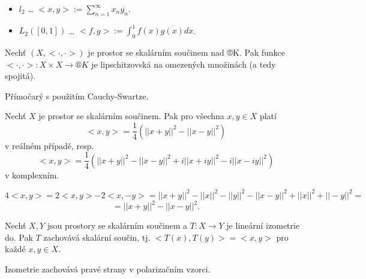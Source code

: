 \documentclass[12pt]{article}					%
\begin{document}
\begin{priklady}
	\begin{itemize}
		\item $l_2$ … $<x, y> := \sum_{n=1}^∞ x_n \overline{y_n}$.
		\item $L_2([0, 1])$ … $<f, g> := \int_0^1 f(x) \overline{g(x)} dx$.
	\end{itemize}
\end{priklady}

\begin{tvrzeni}
	Nechť $(X, <·, ·>)$ je prostor se skalárním součinem nad ®K. Pak funkce $<·, ·>: X \times X \rightarrow ®K$ je lipschitzovská na omezených množinách (a tedy spojitá).

	\begin{dukazin}
		Přímočarý s použitím Cauchy-Swartze.
	\end{dukazin}
\end{tvrzeni}

\begin{tvrzeni}
	Nechť $X$ je prostor se skalárním součinem. Pak pro všechna $x, y \in X$ platí
	$$ <x, y> = \frac{1}{4}(||x + y||^2 - ||x - y||^2) $$
	v reálném případě, resp.
	$$ <x, y> = \frac{1}{4}(||x + y||^2 - ||x - y||^2 + i||x + iy||^2 - i||x - iy||^2) $$
	v komplexním.

	\begin{dukazin}
		$$ 4<x, y> = 2<x, y> - 2<x, -y> = ||x + y||^2 - ||x||^2 - ||y||^2 - ||x - y||^2 + ||x||^2 + ||-y||^2 = $$
		$$ = ||x + y||^2 - ||x - y||^2. $$	
	\end{dukazin}
\end{tvrzeni}

\begin{dusledek}
	Nechť $X, Y$ jsou prostory se skalárním součinem a $T: X \rightarrow Y$ je lineární izometrie do. Pak $T$ zachovává skalární součin, tj. $<T(x), T(y)> = <x, y>$ pro každé $x, y \in X$.

	\begin{dukazin}
		Izometrie zachovává pravé strany v polarizačním vzorci.
	\end{dukazin}
\end{dusledek}

\end{document}

